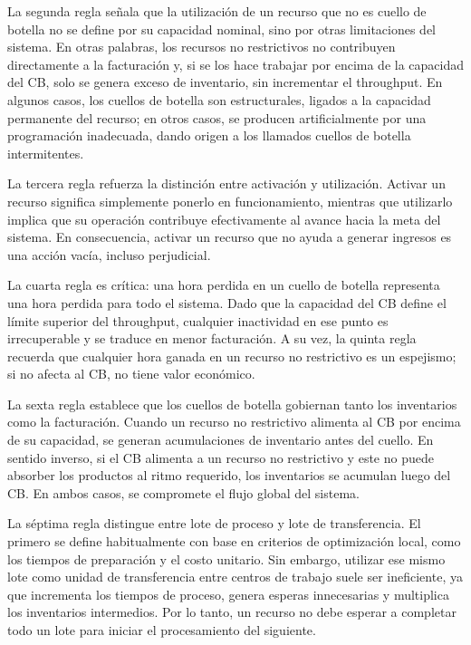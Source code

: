 \documentclass[a4paper,oneside,11pt]{article}
\begin{document}
La segunda regla señala que la utilización de un recurso que no es cuello de botella no se define por su capacidad nominal, sino por otras limitaciones del sistema. En otras palabras, los recursos no restrictivos no contribuyen directamente a la facturación y, si se los hace trabajar por encima de la capacidad del CB, solo se genera exceso de inventario, sin incrementar el throughput. En algunos casos, los cuellos de botella son estructurales, ligados a la capacidad permanente del recurso; en otros casos, se producen artificialmente por una programación inadecuada, dando origen a los llamados cuellos de botella intermitentes.

La tercera regla refuerza la distinción entre activación y utilización. Activar un recurso significa simplemente ponerlo en funcionamiento, mientras que utilizarlo implica que su operación contribuye efectivamente al avance hacia la meta del sistema. En consecuencia, activar un recurso que no ayuda a generar ingresos es una acción vacía, incluso perjudicial.

La cuarta regla es crítica: una hora perdida en un cuello de botella representa una hora perdida para todo el sistema. Dado que la capacidad del CB define el límite superior del throughput, cualquier inactividad en ese punto es irrecuperable y se traduce en menor facturación. A su vez, la quinta regla recuerda que cualquier hora ganada en un recurso no restrictivo es un espejismo; si no afecta al CB, no tiene valor económico.

La sexta regla establece que los cuellos de botella gobiernan tanto los inventarios como la facturación. Cuando un recurso no restrictivo alimenta al CB por encima de su capacidad, se generan acumulaciones de inventario antes del cuello. En sentido inverso, si el CB alimenta a un recurso no restrictivo y este no puede absorber los productos al ritmo requerido, los inventarios se acumulan luego del CB. En ambos casos, se compromete el flujo global del sistema.

La séptima regla distingue entre lote de proceso y lote de transferencia. El primero se define habitualmente con base en criterios de optimización local, como los tiempos de preparación y el costo unitario. Sin embargo, utilizar ese mismo lote como unidad de transferencia entre centros de trabajo suele ser ineficiente, ya que incrementa los tiempos de proceso, genera esperas innecesarias y multiplica los inventarios intermedios. Por lo tanto, un recurso no debe esperar a completar todo un lote para iniciar el procesamiento del siguiente.
\end{document}
